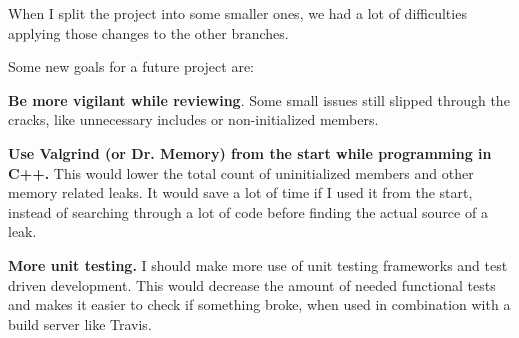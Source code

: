 When I split the project into some smaller ones, we had a lot of difficulties 
applying those changes to the other branches. 

Some new goals for a future project are:

\textbf{Be more vigilant while reviewing}. Some small issues still slipped 
through the cracks, like unnecessary includes or non-initialized members.

\textbf{Use Valgrind (or Dr. Memory) from the start while programming in C++.} 
This would lower the total count of uninitialized members and other memory 
related leaks. It would save a lot of time if I used it from the start, 
instead of searching through a lot of code before finding the actual source 
of a leak.

\textbf{More unit testing.} I should make more use of unit testing frameworks 
and test driven development. This would decrease the amount of needed 
functional tests and makes it easier to check if something broke, when used in 
combination with a build server like Travis.

